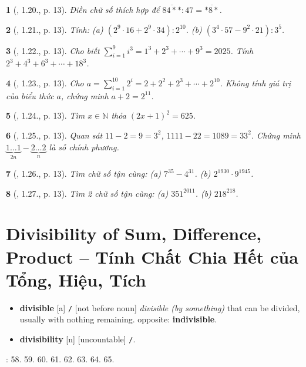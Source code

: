 \documentclass{article}
\newtheorem{baitoan}{}
\begin{document}
\begin{baitoan}[\cite{TLCT_THCS_Toan_6_so_hoc}, 1.20., p. 13]
	Điền chữ số thích hợp để $\overline{84**}:47 = \overline{*8*}$.
\end{baitoan}

\begin{baitoan}[\cite{TLCT_THCS_Toan_6_so_hoc}, 1.21., p. 13]
	Tính: (a) $(2^9\cdot16 + 2^9\cdot34):2^{10}$. (b) $(3^4\cdot57 - 9^2\cdot21):3^5$.
\end{baitoan}

\begin{baitoan}[\cite{TLCT_THCS_Toan_6_so_hoc}, 1.22., p. 13]
	Cho biết $\sum_{i=1}^9 i^3 = 1^3 + 2^3 + \cdots + 9^3 = 2025$. Tính $2^3 + 4^3 + 6^3 + \cdots + 18^3$.
\end{baitoan}

\begin{baitoan}[\cite{TLCT_THCS_Toan_6_so_hoc}, 1.23., p. 13]
	Cho $a = \sum_{i=1}^{10} 2^i = 2 + 2^2 + 2^3 + \cdots + 2^{10}$. Không tính giá trị của biểu thức $a$, chứng minh $a + 2 = 2^11$.
\end{baitoan}

\begin{baitoan}[\cite{TLCT_THCS_Toan_6_so_hoc}, 1.24., p. 13]
	Tìm $x\in\mathbb{N}$ thỏa $(2x + 1)^2 = 625$.
\end{baitoan}

\begin{baitoan}[\cite{TLCT_THCS_Toan_6_so_hoc}, 1.25., p. 13]
	Quan sát $11 - 2 = 9 = 3^2$, $1111 - 22 = 1089 = 33^2$. Chứng minh $\underbrace{1\ldots1}_{2n} - \underbrace{2\ldots2}_n$ là số chính phương.
\end{baitoan}

\begin{baitoan}[\cite{TLCT_THCS_Toan_6_so_hoc}, 1.26., p. 13]
	Tìm chữ số tận cùng: (a) $7^{35} - 4^{31}$. (b) $2^{1930}\cdot9^{1945}$.
\end{baitoan}

\begin{baitoan}[\cite{TLCT_THCS_Toan_6_so_hoc}, 1.27., p. 13]
	Tìm 2 chữ số tận cùng: (a) $351^{2011}$. (b) $218^{218}$.
\end{baitoan}


\section{Divisibility of Sum, Difference, Product -- Tính Chất Chia Hết của Tổng, Hiệu, Tích}
\begin{itemize}\sf
	\item \textbf{divisible} [a] {\tt/} [not before noun] \textit{divisible (by something)} that can be divided, usually with nothing remaining. {\sc opposite}: \textbf{indivisible}.
	\item \textbf{divisibility}  [n] [uncountable] {\tt/}.
\end{itemize}
\cite[\S7, pp. 22--23]{SBT_Toan_6_Canh_Dieu_tap_1}: 58. 59. 60. 61. 62. 63. 64. 65.
\end{document}
